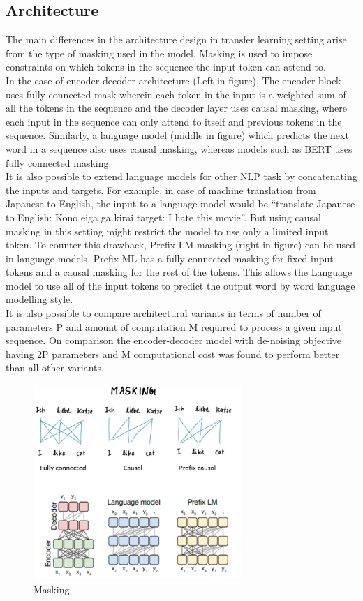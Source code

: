 \subsection{Architecture}
The main differences in the architecture design in transfer learning setting arise from the type of masking used in the model. Masking is used to impose constraints on which tokens in the sequence the input token can attend to. \\
In the case of encoder-decoder architecture (Left in figure), The encoder block uses fully connected mask wherein each token in the input is a weighted sum of all the tokens in the sequence and the decoder layer uses causal masking, where each input in the sequence can only attend to itself and previous tokens in the sequence. Similarly, a language model (middle in figure) which predicts the next word in a sequence also uses causal masking, whereas models such as BERT uses fully connected masking.\\
It is also possible to extend language models for other NLP task by concatenating the inputs and targets. For example, in case of machine translation from Japanese to English, the input to a language model would be “translate Japanese to English: Kono eiga ga kirai target: I hate this movie”. But using causal masking in this setting might restrict the model to use only a limited input token. To counter this drawback, Prefix LM masking (right in figure) can be used in language models. Prefix ML has a fully connected masking for fixed input tokens and a causal masking for the rest of the tokens. This allows the Language model to use all of the input tokens to predict the output word by word language modelling style. \\
It is also possible to compare architectural variants in terms of number of parameters P and amount of computation M required to process a given input sequence. 
On comparison the encoder-decoder model with de-noising objective having 2P parameters and M computational cost was found to perform better than all other variants. \\

\begin{figure}[H]
\centering
\includegraphics[width=0.7\textwidth]{images/masking.png}
\caption{Masking}
\label{fig:masking}
\end{figure} 

